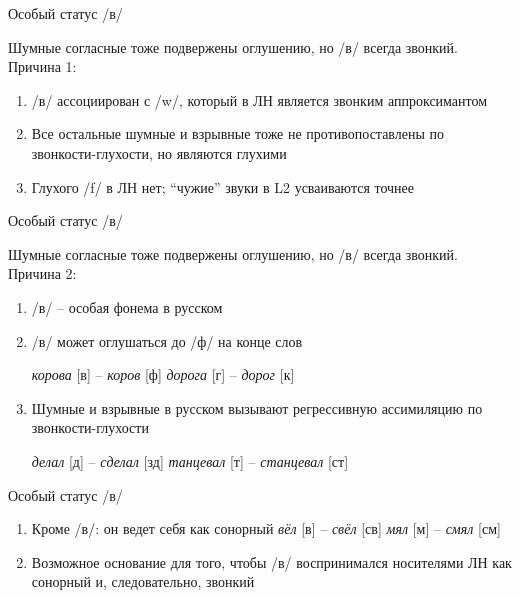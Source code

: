 \documentclass[10 pt, handout]{beamer}
\begin{document}
\begin{frame}{Особый статус /в/}

	Шумные согласные тоже подвержены оглушению, но /в/ всегда звонкий. Причина 1:

	\begin{enumerate}[$\gg$]
		\item /в/ ассоциирован с /w/, который в ЛН является звонким аппроксимантом
		\item Все остальные шумные и взрывные тоже не противопоставлены по звонкости-глухости, но являются глухими
		\item Глухого /f/ в ЛН нет; ``чужие'' звуки в L2 усваиваются точнее \parencite{flege1987}
	\end{enumerate}

\end{frame}

\begin{frame}{Особый статус /в/}

	Шумные согласные тоже подвержены оглушению, но /в/ всегда звонкий. Причина 2:

	\begin{enumerate}[$\gg$]
		\item /в/ -- особая фонема в русском
		\item /в/ может оглушаться до /ф/ на конце слов
		
		\pex 
			\a \emph{корова} [в] -- \emph{коров} [ф]
			\a \emph{дорога} [г] -- \emph{дорог} [к]
		\xe

		\item Шумные и взрывные в русском вызывают регрессивную ассимиляцию по звонкости-глухости
		
		\pex 
			\a \emph{делал} [д] -- \emph{сделал} [зд]
			\a \emph{танцевал} [т] -- \emph{станцевал} [ст]
		\xe
	\end{enumerate}
		
\end{frame}

\begin{frame}{Особый статус /в/}

	\begin{enumerate}[$\gg$]
		\item Кроме /в/: он ведет себя как сонорный
		\pex 
			\a \emph{вёл} [в] -- \emph{свёл} [св]
			\a \emph{мял} [м] -- \emph{смял} [см]
		\xe
		\item Возможное основание для того, чтобы /в/ воспринимался носителями ЛН как сонорный и, следовательно, звонкий
	\end{enumerate}

\end{frame}
\end{document}
